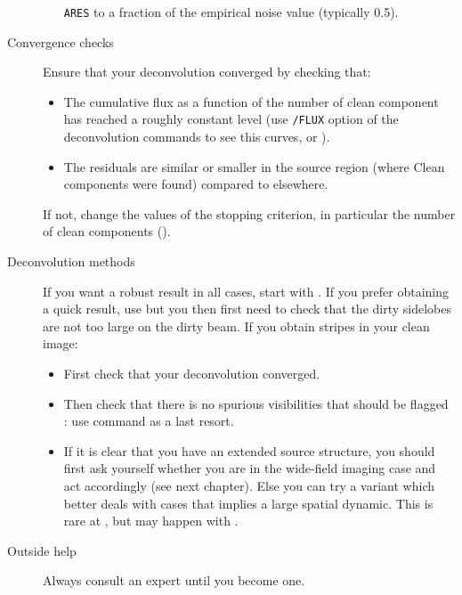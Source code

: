 \begin{description}
\begin{itemize}
    \texttt{ARES} to a fraction of the empirical noise value (typically
    0.5).
  \end{itemize}
\item[Convergence checks] Ensure that your deconvolution converged by
  checking that:
  \begin{itemize}
  \item The cumulative flux as a function of the number of clean component
    has reached a roughly constant level (use \texttt{/FLUX} option of the
    deconvolution commands to see this curves, or ).
  \item The residuals are similar or smaller in the source region (where Clean
  components were found) compared to elsewhere.
  \end{itemize}
  If not, change the values of the stopping criterion, in particular the
  number of clean components ().
\item[Deconvolution methods] If you want a robust result in all cases,
  start with . If you prefer obtaining a quick result, use
   but you then first need to check that the dirty sidelobes are
  not too large on the dirty beam. If you obtain stripes in your clean
  image:
  \begin{itemize}
  \item First check that your deconvolution converged.
  \item Then check that there is no spurious visibilities that should 
   be flagged : use command  as a last resort.
  \item If it is clear that you have an extended source structure, you
    should first ask yourself whether you are in the wide-field imaging
    case and act accordingly (see next chapter). Else you can try a
    \clean{} variant which better deals with cases that implies a large
    spatial dynamic. This is rare at \NOEMA{}, but may happen with \ALMA .
  \end{itemize}
\item[Outside help] Always consult an expert until you become one.
\end{description}

